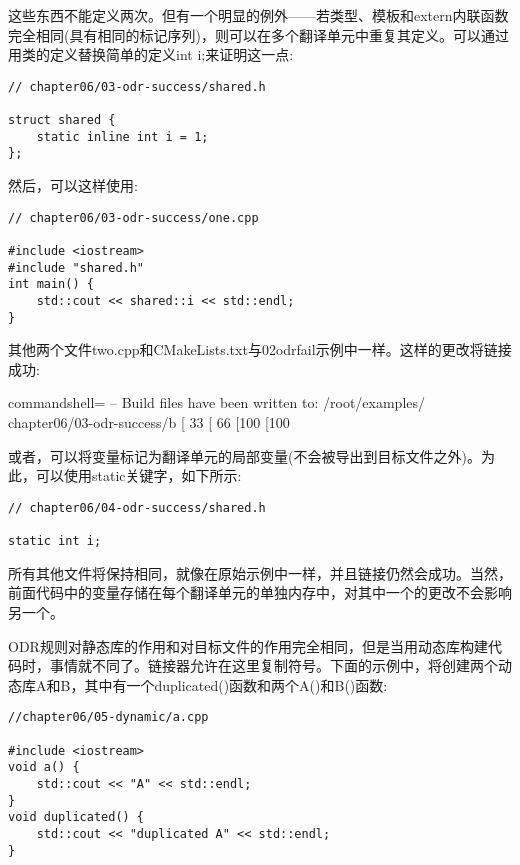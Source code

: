 这些东西不能定义两次。但有一个明显的例外——若类型、模板和extern内联函数完全相同(具有相同的标记序列)，则可以在多个翻译单元中重复其定义。可以通过用类的定义替换简单的定义int i;来证明这一点:

\begin{lstlisting}[style=styleCXX]
// chapter06/03-odr-success/shared.h

struct shared {
	static inline int i = 1;
};
\end{lstlisting}

然后，可以这样使用:

\begin{lstlisting}[style=styleCXX]
// chapter06/03-odr-success/one.cpp

#include <iostream>
#include "shared.h"
int main() {
	std::cout << shared::i << std::endl;
}
\end{lstlisting}

其他两个文件two.cpp和CMakeLists.txt与02odrfail示例中一样。这样的更改将链接成功:

\begin{tcblisting}{commandshell={}}
-- Build files have been written to: /root/examples/
chapter06/03-odr-success/b
[ 33%
[ 66%
[100%
[100%
\end{tcblisting}

或者，可以将变量标记为翻译单元的局部变量(不会被导出到目标文件之外)。为此，可以使用static关键字，如下所示:

\begin{lstlisting}[style=styleCXX]
// chapter06/04-odr-success/shared.h

static int i;
\end{lstlisting}

所有其他文件将保持相同，就像在原始示例中一样，并且链接仍然会成功。当然，前面代码中的变量存储在每个翻译单元的单独内存中，对其中一个的更改不会影响另一个。


ODR规则对静态库的作用和对目标文件的作用完全相同，但是当用动态库构建代码时，事情就不同了。链接器允许在这里复制符号。下面的示例中，将创建两个动态库A和B，其中有一个duplicated()函数和两个A()和B()函数:

\begin{lstlisting}[style=styleCXX]
//chapter06/05-dynamic/a.cpp

#include <iostream>
void a() {
	std::cout << "A" << std::endl;
}
void duplicated() {
	std::cout << "duplicated A" << std::endl;
}
\end{lstlisting}

